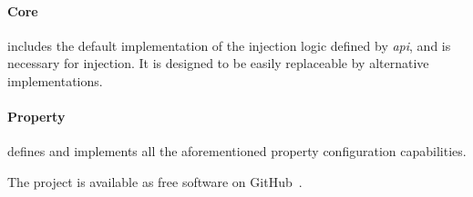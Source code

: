 	\paragraph{Core} includes the default implementation of the injection logic defined by \emph{api}, and is necessary for injection. It is designed to be easily replaceable by alternative implementations.
	
	\paragraph{Property} defines and implements all the aforementioned property configuration capabilities.
	
	\bigbreak
	The project is available as free software on GitHub~\cite{Kreator}.	
	
%













